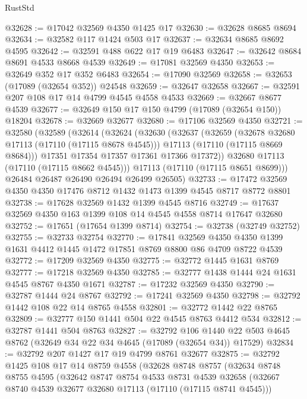 \begin{lexlean}{RustStd}
\begin{coremodule}
@32628 := @17042 @32569 @4350 @1425 @17
@32630 := @32628 @8685 @8694
@32634 := @32582 @117 @1424 @503 @17
@32637 := @32634 @8685 @8692 @4595
@32642 := @32591 @488 @622 @17 @19 @6483
@32647 := @32642 @8684 @8691 @4533 @8668 @4539
@32649 := @17081 @32569 @4350
@32653 := @32649 @352 @17 @352 @6483
@32654 := @17090 @32569
@32658 := @32653 (@17089 (@32654 @352)) @24548
@32659 := @32647 @32658
@32667 := @32591 @207 @108 @17 @14 @4799 @4545 @4558 @4533
@32669 := @32667 @8677 @4539
@32677 := @32649 @150 @17 @150 @4799 (@17089 (@32654 @150)) @18204
@32678 := @32669 @32677
@32680 := @17106 @32569 @4350
@32721 := @32580
    (@32589
      (@32614
        (@32624
          (@32630
            (@32637
              (@32659
                (@32678 @32680 @17113 (@17110 (@17115 @8678 @4545)))
                @17113
                (@17110 (@17115 @8669 @8684)))
              @17351
              @17354
              @17357
              @17361
              @17366
              @17372))
          @32680
          @17113
          (@17110 (@17115 @8662 @4545)))
        @17113
        (@17110 (@17115 @8651 @8699)))
      @26484
      @26487
      @26490
      @26494
      @26499
      @26505)
@32733 := @17472 @32569 @4350 @4350 @17476 @8712 @1432 @1473 @1399 @4545 @8717 @8772 @8801
@32738 := @17628 @32569 @1432 @1399 @4545 @8716
@32749 := @17637 @32569 @4350 @163 @1399 @108 @14 @4545 @4558 @8714 @17647 @32680
@32752 := @17651 (@17654 @1399 @8714)
@32754 := @32738 (@32749 @32752)
@32755 := @32733 @32754
@32770 := @17841
    @32569
    @4350
    @4350
    @1399
    @1631
    @4412
    @1445
    @1472
    @17851
    @8769
    @8800
    @86
    @4709
    @8722
    @4539
@32772 := @17209 @32569 @4350
@32775 := @32772 @1445 @1631 @8769
@32777 := @17218 @32569 @4350
@32785 := @32777 @1438 @1444 @24 @1631 @4545 @8767 @4350 @1671
@32787 := @17232 @32569 @4350
@32790 := @32787 @1444 @24 @8767
@32792 := @17241 @32569 @4350
@32798 := @32792 @1442 @108 @22 @14 @8765 @4558
@32801 := @32772 @1442 @22 @8765
@32809 := @32777 @150 @1441 @504 @22 @4545 @8763 @4412 @534
@32812 := @32787 @1441 @504 @8763
@32827 := @32792
    @106
    @1440
    @22
    @503
    @4645
    @8762
    (@32649 @34 @22 @34 @4645 (@17089 (@32654 @34)) @17529)
@32834 := @32792 @207 @1427 @17 @19 @4799 @8761 @32677
@32875 := @32792
    @1425
    @108
    @17
    @14
    @8759
    @4558
    (@32628
      @8748
      @8757
      (@32634
        @8748
        @8755
        @4595
        (@32642
          @8747
          @8754
          @4533
          @8731
          @4539
          @32658
          (@32667 @8740 @4539 @32677 @32680 @17113 (@17110 (@17115 @8741 @4545)))

\end{coremodule}
\end{lexlean}
